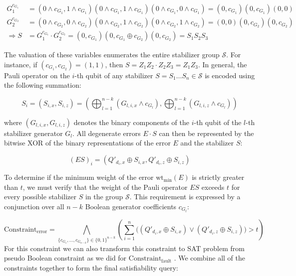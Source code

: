 \documentclass[acmsmallw,review]{acmart}
\begin{document}
{\small
\begin{equation*}
\begin{aligned}
G_1^{c_{G_1}} &= (0 \land c_{G_1}, 1 \land c_{G_1})(0 \land c_{G_1}, 1 \land c_{G_1})(0 \land c_{G_1}, 0 \land c_{G_1}) = (0, c_{G_1})(0, c_{G_1})(0, 0) \\
G_2^{c_{G_2}} &= (0 \land c_{G_2}, 0 \land c_{G_2})(0 \land c_{G_2}, 1 \land c_{G_2})(0 \land c_{G_2}, 1 \land c_{G_2}) = (0, 0)(0, c_{G_2})(0, c_{G_2}) \\
\Rightarrow S &= G_1^{c_{G_1}} \cdot G_2^{c_{G_2}} = (0, c_{G_1}) (0, c_{G_1} \oplus c_{G_2}) (0, c_{G_2}) =S_1S_2S_3
\end{aligned}
\end{equation*}
}

The valuation of these variables enumerates the entire stabilizer group $\mathcal{S}$. For instance, if $(c_{G_1}, c_{G_2}) = (1,1)$, then $S = Z_1Z_2 \cdot Z_2Z_3 = Z_1Z_3$. In general, the Pauli operator on the $i$-th qubit of any stabilizer $S = S_1 \dots S_n \in \mathcal{S}$ is encoded using the following summation:

\begin{equation}
S_i = (S_{i,x}, S_{i,z}) = \left( \bigoplus_{l=1}^{n-k} ( G_{l,i,x} \land c_{G_l}), \bigoplus_{l=1}^{n-k} ( G_{l,i,z} \land c_{G_l}) \right)
\end{equation}

where $(G_{l,i,x}, G_{l,i,z})$ denotes the binary components of the $i$-th qubit of the $l$-th stabilizer generator $G_l$.
All degenerate errors $E \cdot S$ can then be represented by the bitwise XOR of the binary representations of the error $E$ and the stabilizer $S$:

\begin{equation}
(ES)_i = (Q'_{d_i, x} \oplus S_{i,x}, Q'_{d_i, z} \oplus S_{i,z})
\end{equation}

To determine if the minimum weight of the error $\mathrm{wt}_{\min}(E)$ is strictly greater than $t$, we must verify that the weight of the Pauli operator $ES$ exceeds $t$ for every possible stabilizer $S$ in the group $\mathcal{S}$. This requirement is expressed by a conjunction over all $n-k$ Boolean generator coefficients $c_{G_l}$:

\begin{equation}
\mathrm{Constraint}_{\mathrm{error}} = \bigwedge_{\{c_{G_1}, \dots , c_{G_{n-k}}\} \in \{0,1\}^{n-k}} \left( \sum_{i=1}^{n} \Big( (Q'_{d_i, x} \oplus S_{i,x}) \lor (Q'_{d_i, z} \oplus S_{i,z}) \Big) > t \right)
\end{equation}
For this constraint we can also transform this constraint to SAT problem from pseudo Boolean constraint as we did for $\mathrm{Constraint}_{\mathrm{fault}}$ .
We combine all of the constraints together to form the final satisfiability query:
\end{document}
